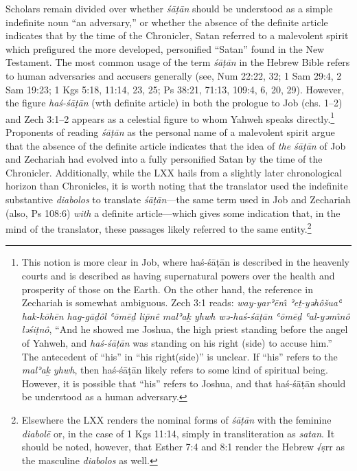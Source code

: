 Scholars remain divided over whether \emph{śāṭān} should be understood
as a simple indefinite noun ``an adversary,''
\autocites{stokes_jbl2009}[114--117]{japhet2009}[370--390]{japhet1993}
or whether the absence of the definite article indicates that by the
time of the Chronicler, Satan referred to a malevolent spirit which
prefigured the more developed, personified ``Satan'' found in the New
Testament.\autocite[4--5]{rollston_keith-stuckenbruck2016} The most
common usage of the term \emph{śāṭān} in the Hebrew Bible refers to
human adversaries and accusers generally (see, Num 22:22, 32; 1 Sam
29:4, 2 Sam 19:23; 1 Kgs 5:18, 11:14, 23, 25; Ps 38:21, 71:13, 109:4, 6,
20, 29). However, the figure \emph{haś-śāṭān} (wth definite article) in
both the prologue to Job (chs. 1--2) and Zech 3:1--2 appears as a
celestial figure to whom Yahweh speaks directly.\footnote{This notion is
  more clear in Job, where haś-śāṭān is described in the heavenly courts
  and is described as having supernatural powers over the health and
  prosperity of those on the Earth. On the other hand, the reference in
  Zechariah is somewhat ambiguous. Zech 3:1 reads: \emph{way-yarʾēnı̂
  ʾeṯ-yəhôšuaʿ hak-kōhēn hag-gāḏôl ʿōmēḏ lip̄nê malʾaḵ yhwh wə-haś-śāṭān
  ʿōmēḏ ʿal-yəmı̂nô ləśiṭnô}, ``And he showed me Joshua, the high priest
  standing before the angel of Yahweh, and \emph{haś-śāṭān} was standing
  on his right (side) to accuse him.'' The antecedent of ``his'' in
  ``his right(side)'' is unclear. If ``his'' refers to the \emph{malʾaḵ
  yhwh}, then haś-śāṭān likely refers to some kind of spiritual being.
  However, it is possible that ``his'' refers to Joshua, and that
  haś-śāṭān should be understood as a human adversary.} Proponents of
reading \emph{śāṭān} as the personal name of a malevolent spirit argue
that the absence of the definite article indicates that the idea of
\emph{the śāṭān} of Job and Zechariah had evolved into a fully
personified Satan by the time of the
Chronicler.\autocites[107]{coggins1976}[Rollston also finds this reading
compelling, though, not without difficulties.
See,][4--5]{rollston_keith-stuckenbruck2016} Additionally, while the LXX
hails from a slightly later chronological horizon than Chronicles, it is
worth noting that the translator used the indefinite substantive
\emph{diabolos} to translate \emph{śāṭān}---the same term used in Job
and Zechariah (also, Ps 108:6) \emph{with} a definite article---which
gives some indication that, in the mind of the translator, these
passages likely referred to the same entity.\footnote{Elsewhere the LXX
  renders the nominal forms of \emph{śāṭān} with the feminine
  \emph{diabolē} or, in the case of 1 Kgs 11:14, simply in
  transliteration as \emph{satan}. It should be noted, however, that
  Esther 7:4 and 8:1 render the Hebrew √ṣrr as the masculine
  \emph{diabolos} as well.}

